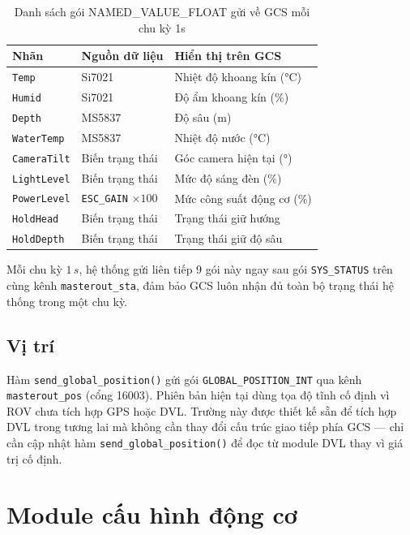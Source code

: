 \documentclass[../DoAn.tex]{subfiles}
\begin{document}
\begin{table}[H]
\centering
\renewcommand{\arraystretch}{1.3}
\begin{tabular}{|l|l|l|}
\hline
\textbf{Nhãn} & \textbf{Nguồn dữ liệu} & \textbf{Hiển thị trên GCS} \\
\hline
\texttt{Temp}       & Si7021           & Nhiệt độ khoang kín (°C) \\
\texttt{Humid}      & Si7021           & Độ ẩm khoang kín (\%) \\
\texttt{Depth}      & MS5837           & Độ sâu (m) \\
\texttt{WaterTemp}  & MS5837           & Nhiệt độ nước (°C) \\
\texttt{CameraTilt} & Biến trạng thái  & Góc camera hiện tại (°) \\
\texttt{LightLevel} & Biến trạng thái  & Mức độ sáng đèn (\%) \\
\texttt{PowerLevel} & \texttt{ESC\_GAIN} $\times 100$ & Mức công suất động cơ (\%) \\
\texttt{HoldHead}   & Biến trạng thái  & Trạng thái giữ hướng \\
\texttt{HoldDepth}  & Biến trạng thái  & Trạng thái giữ độ sâu \\
\hline
\end{tabular}
\caption{Danh sách gói NAMED\_VALUE\_FLOAT gửi về GCS mỗi chu kỳ 1s}
\label{tab:named_value}
\end{table}

Mỗi chu kỳ $1\,s$, hệ thống gửi liên tiếp 9 gói này ngay sau gói
\texttt{SYS\_STATUS} trên cùng kênh \texttt{masterout\_sta}, đảm bảo
GCS luôn nhận đủ toàn bộ trạng thái hệ thống trong một chu kỳ.

\subsection{Vị trí}

Hàm \texttt{send\_global\_position()} gửi gói
\texttt{GLOBAL\_POSITION\_INT} qua kênh \texttt{masterout\_pos} (cổng
16003). Phiên bản hiện tại dùng tọa độ tĩnh cố định vì ROV chưa tích
hợp GPS hoặc DVL. Trường này được thiết kế sẵn để tích hợp DVL trong
tương lai mà không cần thay đổi cấu trúc giao tiếp phía GCS --- chỉ
cần cập nhật hàm \texttt{send\_global\_position()} để đọc từ module
DVL thay vì giá trị cố định.

\section{Module cấu hình động cơ}
\end{document}

